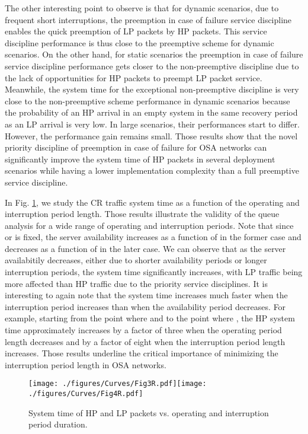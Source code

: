 \documentclass[11pt,journal,oneside,onecolumn,draftclsnofoot]{IEEEtran}
\begin{document}
The other interesting point to observe is that for dynamic scenarios, due to frequent short interruptions, the preemption in case of failure service discipline enables the quick preemption of LP packets by HP packets. This service discipline performance is thus close to the preemptive scheme for dynamic scenarios. On the other hand, for static scenarios the preemption in case of failure service discipline performance gets closer to the non-preemptive discipline due to the lack of opportunities for HP packets to preempt LP packet service. 
Meanwhile, the system time for the exceptional non-preemptive discipline is very close to the non-preemptive scheme performance in dynamic scenarios because the probability of an HP arrival in an empty system in the same recovery period as an LP arrival is very low. In large scenarios, their performances start to differ. However, the performance gain remains small. Those results show that the novel priority discipline of preemption in case of failure for OSA networks can significantly improve the system time of HP packets in several deployment scenarios while having a lower implementation complexity than a full preemptive service discipline.

In Fig. \ref{fig:34212-D1D2-EE-Alpha}, we study the CR traffic system time as a function of the operating and interruption period length. Those results illustrate the validity of the queue analysis for a wide range of operating and interruption periods.  Note that since  or  is fixed, the server availability increases as a function of  in the former case and decreases as a function of  in the later case. We can observe that as the server availabitily decreases, either due to shorter availability periods or longer interruption periods, the system time significantly increases, with LP traffic being more affected than HP traffic due to the priority service disciplines. It is interesting to again note that the system time increases much faster when the interruption period increases than when the availability period decreases. For example, starting from the point where  and  to the point where , the HP system time approximately increases by a factor of three when the operating period length decreases and by a factor of eight when the interruption period length increases. Those results underline the critical importance of minimizing the interruption period length in OSA networks.
\begin{figure}\texttt{[image: ./figures/Curves/Fig3R.pdf]}\texttt{[image: ./figures/Curves/Fig4R.pdf]}\caption{System time of HP and LP packets vs.  operating and interruption period duration.}\label{fig:34212-D1D2-EE-Alpha}\end{figure}
\end{document}
